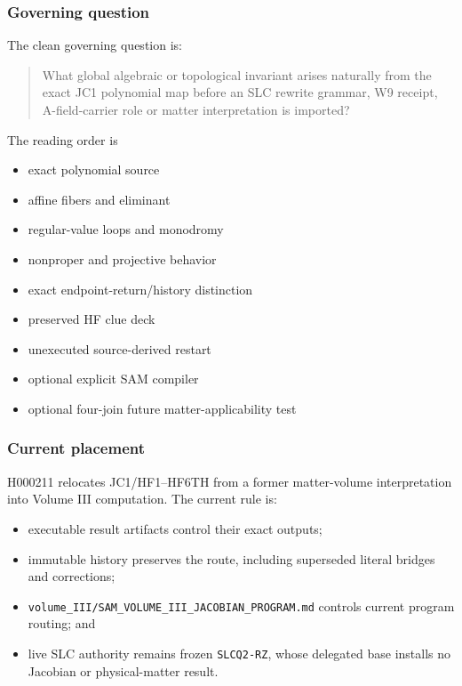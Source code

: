 \subsubsection{Governing question}\label{viii-ch11-governing-question}

The clean governing question is:

\begin{quote}
What global algebraic or topological invariant arises naturally from the
exact JC1 polynomial map before an SLC rewrite grammar, W9 receipt,
A-field-carrier role or matter interpretation is imported?
\end{quote}

The reading order is

\begin{itemize}
\tightlist
\item
  exact polynomial source
\item
  affine fibers and eliminant
\item
  regular-value loops and monodromy
\item
  nonproper and projective behavior
\item
  exact endpoint-return/history distinction
\item
  preserved HF clue deck
\item
  unexecuted source-derived restart
\item
  optional explicit SAM compiler
\item
  optional four-join future matter-applicability test
\end{itemize}

\subsubsection{Current placement}\label{viii-ch11-current-placement}

H000211 relocates JC1/HF1--HF6TH from a former matter-volume
interpretation into Volume III computation. The current rule is:

\begin{itemize}
\tightlist
\item
  executable result artifacts control their exact outputs;
\item
  immutable history preserves the route, including superseded literal
  bridges and corrections;
\item
  \nolinkurl{volume_III/SAM_VOLUME_III_JACOBIAN_PROGRAM.md} controls
  current program routing; and
\item
  live SLC authority remains frozen \texttt{SLCQ2-RZ}, whose delegated
  base installs no Jacobian or physical-matter result.
\end{itemize}

